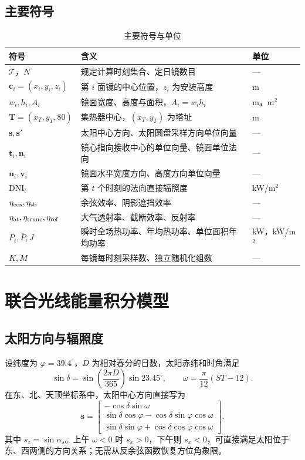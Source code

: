 \documentclass[UTF8,a4paper,zihao=-4,fontset=mac]{ctexart}
\newcommand{\vect}[1]{\bm{#1}}
\newcommand{\DNI}{\mathrm{DNI}}
\newcommand{\mean}[1]{\overline{#1}}
\begin{document}
\subsection{主要符号}
\begin{table}[H]
\centering\small
\caption{主要符号与单位}
\begin{tabular}{p{27mm}p{98mm}l}
\toprule
符号 & 含义 & 单位\\\midrule
$\mathcal T$，$N$ & 规定计算时刻集合、定日镜数目 & ---\\
$\vect c_i=(x_i,y_i,z_i)$ & 第 $i$ 面镜的中心位置，$z_i$ 为安装高度 & m\\
$w_i,h_i,A_i$ & 镜面宽度、高度与面积，$A_i=w_ih_i$ & m，m$^2$\\
$\vect T=(x_T,y_T,80)$ & 集热器中心，$(x_T,y_T)$ 为塔址 & m\\
$\vect s,\vect s'$ & 太阳中心方向、太阳圆盘采样方向单位向量 & ---\\
$\vect t_i,\vect n_i$ & 镜心指向接收中心的单位向量、镜面单位法向 & ---\\
$\vect u_i,\vect v_i$ & 镜面水平宽度方向、高度方向单位向量 & ---\\
$\DNI_t$ & 第 $t$ 个时刻的法向直接辐照度 & kW/m$^2$\\
$\eta_{\rm cos},\eta_{\rm sb}$ & 余弦效率、阴影遮挡效率 & ---\\
$\eta_{\rm at},\eta_{\rm trunc},\eta_{\rm ref}$ & 大气透射率、截断效率、反射率 & ---\\
$P_t,\mean P,J$ & 瞬时全场热功率、年均热功率、单位面积年均功率 & kW，kW/m$^2$\\
$K,M$ & 每镜每时刻采样数、独立随机化组数 & ---\\\bottomrule
\end{tabular}
\end{table}

\section{联合光线能量积分模型}
\subsection{太阳方向与辐照度}
设纬度为 $\varphi=39.4^\circ$，$D$ 为相对春分的日数，太阳赤纬和时角满足
\begin{equation}
\sin\delta=\sin\!\left(\frac{2\pi D}{365}\right)\sin23.45^\circ,
\qquad \omega=\frac{\pi}{12}(ST-12).
\end{equation}
在东、北、天顶坐标系中，太阳中心方向直接写为
\begin{equation}
\vect s=\begin{bmatrix}
-\cos\delta\sin\omega\\
\sin\delta\cos\varphi-\cos\delta\sin\varphi\cos\omega\\
\sin\delta\sin\varphi+\cos\delta\cos\varphi\cos\omega
\end{bmatrix}.
\label{eq:sun}
\end{equation}
其中 $s_z=\sin\alpha_s$。上午 $\omega<0$ 时 $s_x>0$，下午则 $s_x<0$，可直接满足太阳位于东、西两侧的方向关系；无需从反余弦函数恢复方位角象限。
\end{document}
